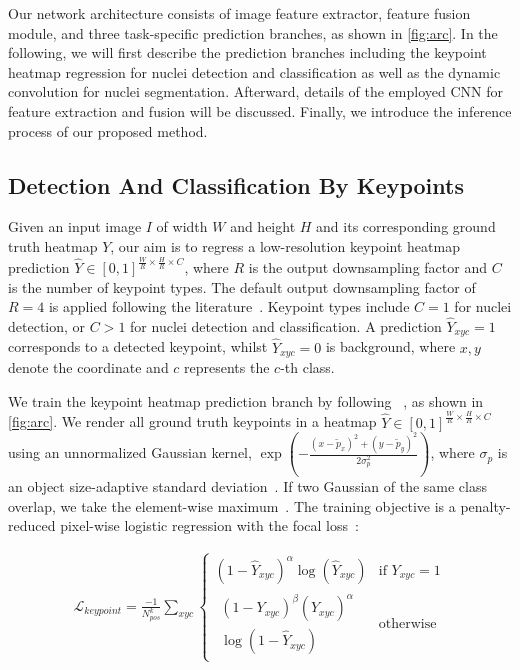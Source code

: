 \documentclass[lettersize,journal]{IEEEtran}
\begin{document}
Our network architecture consists of image feature extractor, feature fusion module, and three task-specific prediction branches, as shown in \autoref{fig:arc}. In the following, we will first describe the prediction branches including the keypoint heatmap regression for nuclei detection and classification as well as the dynamic convolution for nuclei segmentation. Afterward, details of the employed CNN for feature extraction and fusion will be discussed. Finally, we introduce the inference process of our proposed method.


\subsection{Detection And Classification By Keypoints}
Given an input image $I$ of width $W$ and height $H$ and its corresponding ground truth heatmap $Y$, our aim is to regress a low-resolution keypoint heatmap prediction $\hat{Y} \in {[0,1]}^{{\frac{W}{R} \times \frac{H}{R} \times C}}$, where $R$ is the output downsampling factor and $C$ is the number of keypoint types. The default output downsampling factor of $R=4$ is applied following the literature~\cite{stride1,stride2}. Keypoint types include $C=1$ for nuclei detection, or $C>1$ for nuclei detection and classification. A prediction $\hat{Y}_{xyc} = 1$ corresponds to a detected keypoint, whilst $\hat{Y}_{xyc} = 0$ is background, where $x, y$ denote the coordinate and $c$ represents the $c$-th class.

We train the keypoint heatmap prediction branch by following ~\cite{CenterNet}, as shown in \autoref{fig:arc}. We render all ground truth keypoints in a heatmap $\hat{Y} \in {[0,1]}^{{\frac{W}{R} \times \frac{H}{R} \times C}}$ using an unnormalized Gaussian kernel, $\exp{(-\frac{(x-\tilde{p}_x)^2+(y-\tilde{p}_y)^2}{2\sigma^2_p})}$, where $\sigma_p$ is an object size-adaptive standard deviation~\cite{Cornernet}. 
If two Gaussian of the same class overlap, we take the element-wise maximum~\cite{stride1}. The training objective is a penalty-reduced pixel-wise logistic regression with the focal loss~\cite{focalloss}:

\begin{align*}
\mathcal{L}_{keypoint}=\frac{-1}{N_{pos}^k}\sum_{xyc}\left\{\begin{matrix}
 (1-\hat{Y}_{xyc})^\alpha \log{(\hat{Y}_{xyc})}  & \text{if $Y_{xyc}=1$} \\ 
\begin{matrix}
(1-Y_{xyc})^\beta(\hat{Y}_{xyc})^\alpha \\ 
\log{(1-\hat{Y}_{xyc})}
\end{matrix}& \text{otherwise}
\end{matrix}\right.
\end{align*}
\end{document}
